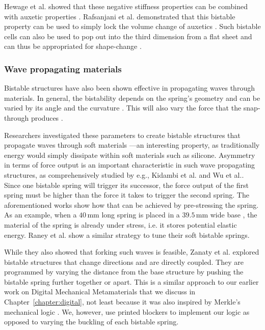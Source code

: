 {Hewage et al. showed that these negative stiffness properties can be combined with auxetic properties \cite{Hewage2016}. Rafsanjani et al. demonstrated that this bistable property can be used to simply lock the volume change of auxetics \cite{Rafsanjani2016}. Such bistable cells can also be used to pop out into the third dimension from a flat sheet and can thus be appropriated for shape-change \cite{Haghpanah2016, Chen2017}. 


\subsubsection{Wave propagating materials}

Bistable structures have also been shown effective in propagating waves through materials. In general, the bistability depends on the spring's geometry and can be varied by its angle \cite{Beharic2014} and the curvature \cite{Qiu2004}. This will also vary the force that the snap-through produces \cite{Cazottes2009}. 

Researchers investigated these parameters to create bistable structures that propagate waves through soft materials \cite{Nadkarni2014, Raney2016}---an interesting property, as traditionally energy would simply dissipate within soft materials such as silicone. Asymmetry in terms of force output is an important characteristic in such wave propagating structures, as comprehensively studied by e.g., Kidambi et al. \cite{Kidambi2017} and Wu et al.\cite{Wu2018}. Since one bistable spring will trigger its successor, the force output of the first spring must be higher than the force it takes to trigger the second spring. The aforementioned works show how that can be achieved by pre-stressing the spring. As an example, when a $40\, \mathrm{mm}$ long spring is placed in a $39.5\, \mathrm{mm}$ wide base \cite{Kidambi2017}, the material of the spring is already under stress, i.e. it stores potential elastic energy. Raney et al. \cite{Raney2016} show a similar strategy to tune their soft bistable springs. 

While they also showed that forking such waves is feasible, Zanaty et al. \cite{Zanaty2018} explored bistable structures that change directions and are directly coupled. They are programmed by varying the distance from the base structure by pushing the bistable spring further together or apart. This is a similar approach to our earlier work on Digital Mechanical Metamaterials that we discuss in Chapter~\ref{chapter:digital}, not least because it was also inspired by Merkle's mechanical logic \cite{Merkle1993}. We, however, use printed blockers to implement our logic as opposed to varying the buckling of each bistable spring. 

}
